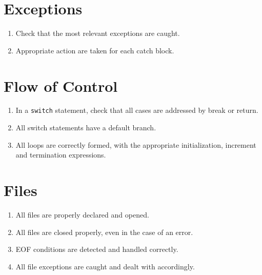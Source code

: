 \section*{Exceptions}\begin{enumerate}[resume]
\item Check that the most relevant exceptions are caught.
\item Appropriate action are taken for each catch block.
\end{enumerate}

\section*{Flow of Control}\begin{enumerate}[resume]
\item In a \texttt{switch} statement, check that all cases are addressed by break or return.
\item All switch statements have a default branch.
\item All loops are correctly formed, with the appropriate initialization, increment and termination expressions.
\end{enumerate}

\section*{Files}\begin{enumerate}[resume]
\item All files are properly declared and opened.
\item All files are closed properly, even in the case of an error.
\item EOF conditions are detected and handled correctly.
\item All file exceptions are caught and dealt with accordingly.
\end{enumerate}


